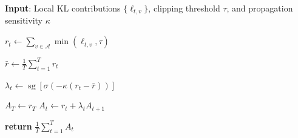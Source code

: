 \documentclass[letterpaper]{article} %
\begin{document}
\begin{algorithm}[t]
\caption{DASH aggregation for one student rollout. Gradients flow only
through the local signals $r_t$.}
\label{alg:dash}
\small
\textbf{Input}: Local KL contributions $\{\ell_{t,v}\}$, clipping
threshold $\tau$, and propagation sensitivity $\kappa$\par
\begin{algorithmic}[1]
    \STATE
    $r_t
    \leftarrow
    \sum_{v\in\mathcal A}
    \min(\ell_{t,v},\tau)$
\ENDFOR

\STATE
$\bar r
\leftarrow
\frac{1}{T}\sum_{t=1}^{T}r_t$

    \STATE
    $\lambda_t
    \leftarrow
    \operatorname{sg}
    \left[
        \sigma\left(-\kappa(r_t-\bar r)\right)
    \right]$
\ENDFOR

\STATE $A_T\leftarrow r_T$
    \STATE
    $A_t\leftarrow r_t+\lambda_tA_{t+1}$
\ENDFOR

\STATE \textbf{return}
$\frac{1}{T}\sum_{t=1}^{T}A_t$
\end{algorithmic}
\end{algorithm}




\end{document}
